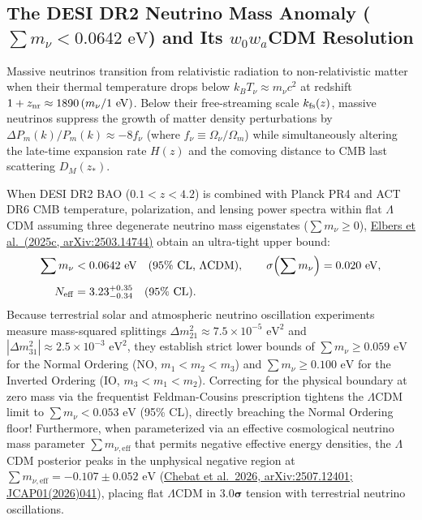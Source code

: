 \documentclass[aps,prd,preprint,superscriptaddress,nofootinbib]{revtex4-2}
\begin{document}
\subsection{The DESI DR2 Neutrino Mass Anomaly ($\sum m_\nu < 0.0642\text{ eV}$) and Its $w_0 w_a$CDM Resolution}

Massive neutrinos transition from relativistic radiation to non-relativistic matter when their thermal temperature drops below $k_B T_\nu \approx m_\nu c^2$ at redshift $1 + z_{\rm nr} \approx 1890\, (m_\nu / 1\text{ eV})$. Below their free-streaming scale $k_{\rm fs}(z)$, massive neutrinos suppress the growth of matter density perturbations by $\Delta P_m(k)/P_m(k) \approx -8 f_\nu$ (where $f_\nu \equiv \Omega_\nu / \Omega_m$) while simultaneously altering the late-time expansion rate $H(z)$ and the comoving distance to CMB last scattering $D_M(z_*)$.

When DESI DR2 BAO ($0.1 < z < 4.2$) is combined with Planck PR4 and ACT DR6 CMB temperature, polarization, and lensing power spectra within flat $\Lambda$CDM assuming three degenerate neutrino mass eigenstates ($\sum m_\nu \ge 0$), \href{https://arxiv.org/abs/2503.14744}{Elbers et al.\ (2025c, arXiv:2503.14744)} obtain an ultra-tight upper bound:
\begin{equation}
\begin{aligned}
    \sum m_\nu &< 0.0642\text{ eV}\quad (95\%\text{ CL, }\Lambda\text{CDM}), \qquad \sigma\!\left(\sum m_\nu\right) = 0.020\text{ eV}, \\[4pt]
    N_{\rm eff} &= 3.23^{+0.35}_{-0.34}\quad (95\%\text{ CL}).
\end{aligned}
    \label{m:eq:desi_dr2_mnu_lcdm}
\end{equation}
Because terrestrial solar and atmospheric neutrino oscillation experiments measure mass-squared splittings $\Delta m_{21}^2 \approx 7.5 \times 10^{-5}\text{ eV}^2$ and $|\Delta m_{31}^2| \approx 2.5 \times 10^{-3}\text{ eV}^2$, they establish strict lower bounds of $\sum m_\nu \ge 0.059\text{ eV}$ for the Normal Ordering (NO, $m_1 < m_2 < m_3$) and $\sum m_\nu \ge 0.100\text{ eV}$ for the Inverted Ordering (IO, $m_3 < m_1 < m_2$). Correcting for the physical boundary at zero mass via the frequentist Feldman-Cousins prescription tightens the $\Lambda$CDM limit to $\sum m_\nu < 0.053\text{ eV}$ (95\% CL), directly breaching the Normal Ordering floor! Furthermore, when parameterized via an effective cosmological neutrino mass parameter $\sum m_{\nu,\text{eff}}$ that permits negative effective energy densities, the $\Lambda$CDM posterior peaks in the unphysical negative region at $\sum m_{\nu,\text{eff}} = -0.107 \pm 0.052\text{ eV}$ (\href{https://arxiv.org/abs/2507.12401}{Chebat et al.\ 2026, arXiv:2507.12401; JCAP01(2026)041}), placing flat $\Lambda$CDM in $\mathbf{3.0}\boldsymbol{\sigma}$ tension with terrestrial neutrino oscillations.
\end{document}
